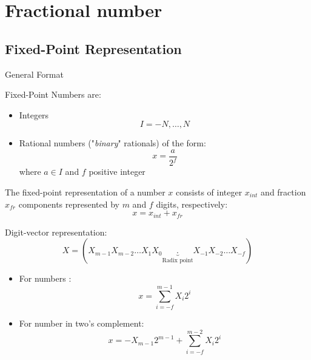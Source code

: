 

\section{Fractional number}
\subsection{Fixed-Point Representation}
\begin{parag}{General Format}
    \begin{definition}
        Fixed-Point Numbers are:
        \begin{itemize}
            \item Integers
            \[I = -N, \dots, N\]
            \item Rational numbers ("\textit{binary}" rationals) of the form:
            \[x = \frac{a}{2^f}\]
            where $a \in I$ and $f$ positive integer
        \end{itemize}
    \end{definition}
    The fixed-point representation of a number $x$ consists of integer $x_{int}$ and fraction $x_{fr}$ components represented by $m$ and $f$ digits, respectively:
    \[x = x_{int} + x_{fr}\]
    \begin{definition}
        Digit-vector representation: 
        \[X = (X_{m-1}X_{m-2}\dots X_1X_0\underbrace{.}_{\text{Radix point}}X_{-1}X_{-2}\dots X_{-f})\]
        \begin{itemize}
            \item For  numbers : 
            \[x = \sum_{i  = -f}^{m-1}X_i2^i\]
            \item For  number in two's complement: 
            \[x = -X_{m-1}2^{m-1} + \sum_{i = -f}^{m-2}X_i2^i\]
        \end{itemize}
    \end{definition}
\end{parag}
